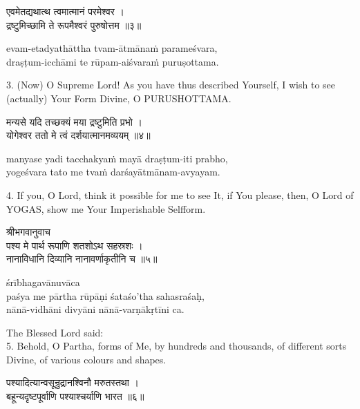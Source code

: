 \begin{gitaverse}
एवमेतद्यथात्थ त्वमात्मानं परमेश्वर । \\
द्रष्टुमिच्छामि ते रूपमैश्वरं पुरुषोत्तम ॥३॥
\end{gitaverse}

\begin{transliteration}
evam-etadyathāttha tvam-ātmānaṁ parameśvara, \\
draṣṭum-icchāmi te rūpam-aiśvaraṁ puruṣottama.
\end{transliteration}

3. (Now) O Supreme Lord! As you have thus described Yourself, I wish to see
(actually) Your Form Divine, O PURUSHOTTAMA.\@

\begin{gitaverse}
मन्यसे यदि तच्छक्यं मया द्रष्टुमिति प्रभो । \\
योगेश्वर ततो मे त्वं दर्शयात्मानमव्ययम् ॥४॥
\end{gitaverse}

\begin{transliteration}
manyase yadi tacchakyaṁ mayā draṣṭum-iti prabho, \\
yogeśvara tato me tvaṁ darśayātmānam-avyayam.
\end{transliteration}

4. If you, O Lord, think it possible for me to see It, if You please, then, O
Lord of YOGAS, show me Your Imperishable Selfform.

\begin{gitaverse}
श्रीभगवानुवाच \\
पश्य मे पार्थ रूपाणि शतशोऽथ सहस्रशः । \\
नानाविधानि दिव्यानि नानावर्णाकृतीनि च ॥५॥
\end{gitaverse}

\begin{transliteration}
śrībhagavānuvāca \\
paśya me pārtha rūpāṇi śataśo'tha sahasraśaḥ, \\
nānā-vidhāni divyāni nānā-varṇākṛtīni ca.
\end{transliteration}

The Blessed Lord said: \\
5. Behold, O Partha, forms of Me, by hundreds and thousands, of different sorts
Divine, of various colours and shapes.

\begin{gitaverse}
पश्यादित्यान्वसून्रुद्रानश्विनौ मरुतस्तथा । \\
बहून्यदृष्टपूर्वाणि पश्याश्चर्याणि भारत ॥६॥
\end{gitaverse}

